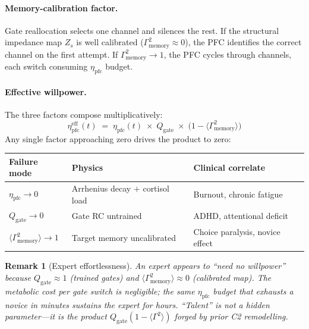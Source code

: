 \documentclass[aps,pre,twocolumn,superscriptaddress,floatfix]{revtex4-2}
\newtheorem{remark}{Remark}
\begin{document}
\paragraph{Memory-calibration factor.}
Gate reallocation selects one channel and silences the rest.
If the structural impedance map $Z_s$ is well calibrated
($\Gamma^2_{\text{memory}} \approx 0$), the PFC identifies
the correct channel on the first attempt.
If $\Gamma^2_{\text{memory}} \to 1$, the PFC cycles through
channels, each switch consuming $\eta_{\text{pfc}}$ budget.

\paragraph{Effective willpower.}
The three factors compose multiplicatively:
\begin{equation}
  \boxed{
  \eta_{\text{pfc}}^{\text{eff}}(t)
  \;=\;
  \eta_{\text{pfc}}(t)
  \;\times\;
  Q_{\text{gate}}
  \;\times\;
  \bigl(1 - \langle\Gamma^2_{\text{memory}}\rangle\bigr)
  }
  \label{eq:willpower-trifactor}
\end{equation}
Any single factor approaching zero drives the product
to zero:
\begin{center}
\begin{tabular}{@{}lll@{}}
\toprule
Failure mode & Physics & Clinical correlate \\
\midrule
$\eta_{\text{pfc}} \to 0$
  & Arrhenius decay $+$ cortisol load
  & Burnout, chronic fatigue \\
$Q_{\text{gate}} \to 0$
  & Gate RC untrained
  & ADHD, attentional deficit \\
$\langle\Gamma^2_{\text{memory}}\rangle \to 1$
  & Target memory uncalibrated
  & Choice paralysis, novice effect \\
\bottomrule
\end{tabular}
\end{center}

\begin{remark}[Expert effortlessness]
\label{rem:expert-effortless}
An expert appears to ``need no willpower'' because
$Q_{\text{gate}} \approx 1$ (trained gates) and
$\langle\Gamma^2_{\text{memory}}\rangle \approx 0$
(calibrated map).
The metabolic cost per gate switch is negligible;
the same $\eta_{\text{pfc}}$ budget that exhausts a
novice in minutes sustains the expert for hours.
``Talent'' is not a hidden parameter---it is the
product $Q_{\text{gate}} (1 - \langle\Gamma^2\rangle)$
forged by prior C2 remodelling.
\end{remark}
\end{document}
